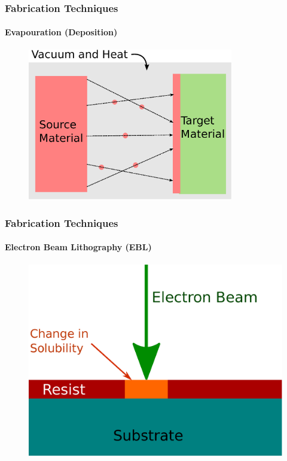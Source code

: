 \documentclass{beamer}
\begin{document}

\begin{frame}
    \frametitle{Fabrication Techniques}
    \framesubtitle{Evapouration (Deposition)}
    \begin{figure}[!htb]
        \centering
        \includegraphics[width=0.8\textwidth]{img/evaporation.eps}
    \end{figure}
\end{frame}


\begin{frame}
    \frametitle{Fabrication Techniques}
    \framesubtitle{Electron Beam Lithography (EBL)}
    \begin{figure}[!htb]
        \centering
        \includegraphics[height=0.8\textheight]{img/ebeam.eps}
    \end{figure}
\end{frame}
\end{document}
